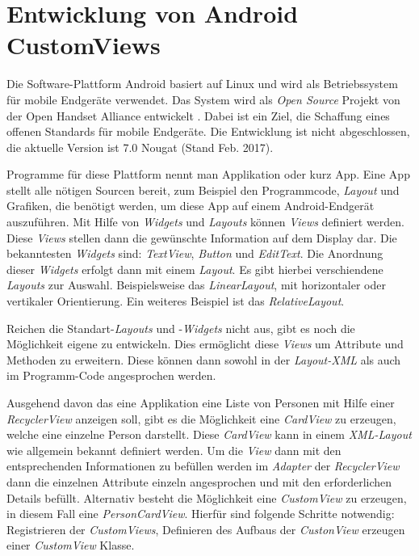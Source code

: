 \section{Entwicklung von Android CustomViews}\label{sec:custom_view}
Die Software-Plattform Android basiert auf Linux und wird als Betriebssystem für mobile Endgeräte verwendet.
Das System wird als \textit{Open Source} Projekt von der Open Handset Alliance entwickelt \cite{open_handset_alliance}. Dabei ist ein Ziel, die Schaffung eines offenen Standards für mobile Endgeräte.
Die Entwicklung ist nicht abgeschlossen, die aktuelle Version ist 7.0 Nougat (Stand Feb. 2017).

Programme für diese Plattform nennt man Applikation oder kurz App. Eine App stellt alle nötigen Sourcen bereit, zum Beispiel den Programmcode, \textit{Layout} und Grafiken, die benötigt werden, um diese App auf einem Android-Endgerät auszuführen.
Mit Hilfe von \textit{Widgets} und \textit{Layouts} können \textit{Views} definiert werden. Diese \textit{Views} stellen dann die gewünschte Information auf dem Display dar. Die bekanntesten \textit{Widgets} sind: \textit{TextView}, \textit{Button} und \textit{EditText}. Die Anordnung dieser \textit{Widgets} erfolgt dann mit einem \textit{Layout}. Es gibt hierbei verschiendene \textit{Layouts} zur Auswahl. Beispielsweise das \textit{LinearLayout}, mit horizontaler oder vertikaler Orientierung. Ein weiteres Beispiel ist das \textit{RelativeLayout}.

Reichen die Standart-\textit{Layouts} und -\textit{Widgets} nicht aus, gibt es noch die Möglichkeit eigene zu entwickeln. Dies ermöglicht diese \textit{Views} um Attribute und Methoden zu erweitern. Diese können dann sowohl in der \textit{Layout-XML} als auch im Programm-Code angesprochen werden.

Ausgehend davon das eine Applikation eine Liste von Personen mit Hilfe einer \textit{RecyclerView} anzeigen soll, gibt es die Möglichkeit eine \textit{CardView} zu erzeugen, welche eine einzelne Person darstellt. Diese \textit{CardView} kann in einem \textit{XML-Layout} wie allgemein bekannt definiert werden. Um die \textit{View} dann mit den entsprechenden Informationen zu befüllen werden im \textit{Adapter} der \textit{RecyclerView} dann die einzelnen Attribute einzeln angesprochen und mit den erforderlichen Details befüllt.
Alternativ besteht die Möglichkeit eine \textit{CustomView} zu erzeugen, in diesem Fall eine \textit{PersonCardView}.
Hierfür sind folgende Schritte notwendig: Registrieren der \textit{CustomViews}, Definieren des Aufbaus der \textit{CustonView} erzeugen einer \textit{CustomView} Klasse.

